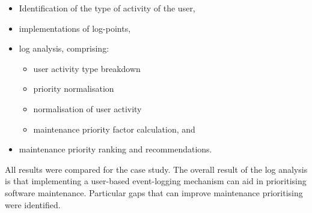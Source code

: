 \begin{itemize}
	\item Identification of the type of activity of the user,
	\item implementations of log-points,
	\item log analysis, comprising:
		\begin{itemize}
			\item user activity type breakdown
			\item priority normalisation
			\item normalisation of user activity
			\item maintenance priority factor calculation, and
		\end{itemize}
	\item maintenance priority ranking and recommendations. 
\end{itemize}

All results were compared for the case study. The overall result of the log analysis is that implementing a user-based event-logging mechanism can aid in prioritising software maintenance. Particular gaps that can improve maintenance prioritising were identified.
